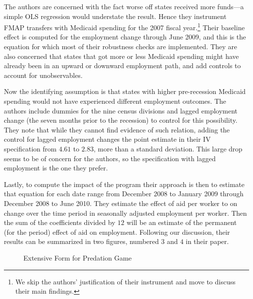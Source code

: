 \documentclass{article}
\begin{document}
The authors are concerned with the fact worse off states received more funds---a simple OLS regression would understate the result. Hence they instrument FMAP transfers with Medicaid spending for the 2007 fiscal year.\footnote{We skip the authors' justification of their instrument and move to discuss their main findings.} Their baseline effect is computed for the employment change through June 2009, and this is the equation for which most of their robustness checks are implemented. They are also concerned that states that got more or less Medicaid spending might have already been in an upward or downward employment path, and add controls to account for unobservables.

Now the identifying assumption is that states with higher pre-recession Medicaid spending would not have experienced different employment outcomes. The authors include dummies for the nine census divisions and lagged employment change (the seven months prior to the recession) to control for this possibility. They note that while they cannot find evidence of such relation, adding the control for lagged employment changes the point estimate in their IV specification from $4.61$ to $2.83$, more than a standard deviation. This large drop seems to be of concern for the authors, so the specification with lagged employment is the one they prefer.

Lastly, to compute the impact of the program their approach is then to estimate that equation for each date range from December 2008 to January 2009 through December 2008 to June 2010. They estimate the effect of aid per worker to on change over the time period in seasonally adjusted employment per worker. Then the sum of the coefficients divided by $12$ will be an estimate of the permanent (for the period) effect of aid on employment. Following our discussion, their results can be summarized in two figures, numbered $3$ and $4$ in their paper.
\begin{figure}[!ht]
  \centering
  \caption{Extensive Form for Predation Game}
  \label{fig:extensive_form_for_predation_game}
\end{figure}
\end{document}
